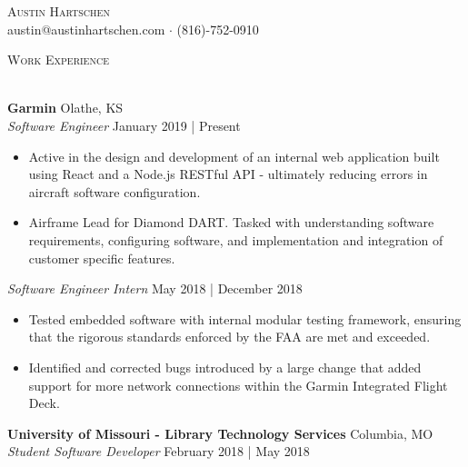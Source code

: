 \documentclass[a4paper]{article}
\newcommand{\lineunder} {
    \vspace*{-8pt} \\
    \hspace*{-18pt} \hrulefill \\
}
\newcommand{\header} [1] {
    {\hspace*{-18pt}\vspace*{6pt} \textsc{#1}}
    \vspace*{-6pt} \lineunder
}
\begin{document}
\vspace*{-45pt}

\vspace*{-15pt}
\begin{center}
	{\Huge \scshape {Austin Hartschen}}\\
	austin@austinhartschen.com $\cdot$ (816)-752-0910\\
\end{center}

\header{Work Experience}
\vspace{1mm}

\textbf{Garmin} \hfill Olathe, KS\\
\textit{Software Engineer} \hfill January 2019 | Present\\
\vspace{-1mm}
\begin{itemize} \itemsep 1pt
        \item Active in the design and development of an internal web application built using React and a Node.js RESTful API - ultimately reducing errors in aircraft software configuration.
        \item Airframe Lead for Diamond DART. Tasked with understanding software requirements, configuring software, and implementation and integration of customer specific features.
\end{itemize}
\textit{Software Engineer Intern} \hfill May 2018 | December 2018\\
\vspace{-1mm}
\begin{itemize} \itemsep 1pt
	\item Tested embedded software with internal modular testing framework, ensuring that the rigorous standards enforced by the FAA are met and exceeded.
	\item Identified and corrected bugs introduced by a large change that added support for more network connections within the Garmin Integrated Flight Deck.
\end{itemize}
\textbf{University of Missouri - Library Technology Services} \hfill Columbia, MO\\
\textit{Student Software Developer} \hfill February 2018 | May 2018\\
\end{document}
